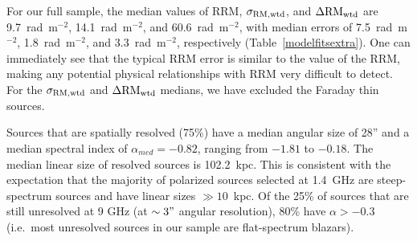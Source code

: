 \documentclass{mnras}
\newcommand*\sigmaRMwtd{\sigma_{\rm RM, wtd}}
\newcommand*\gradRMwtd{\Delta{\rm RM_{wtd}}}
\begin{document}
For our full sample, the median values of RRM, $\sigmaRMwtd$, and $\gradRMwtd$ are 9.7~rad~m$^{-2}$, 14.1~rad~m$^{-2}$, and 60.6~rad~m$^{-2}$, with median errors of 7.5~rad~m$^{-2}$, 1.8~rad~m$^{-2}$, and 3.3~rad~m$^{-2}$, respectively  (Table~\ref{modelfitsextra}). One can immediately see that the typical RRM error is similar to the value of the RRM, making any potential physical relationships with RRM very difficult to detect. For the $\sigmaRMwtd$ and $\gradRMwtd$ medians, we have excluded the Faraday thin sources.

Sources that are spatially resolved (75\%) have a median angular size of 28'' and a median spectral index of $\alpha_{med} = -0.82$, ranging from $-1.81$ to $-0.18$. The median linear size of resolved sources is 102.2~kpc. This is consistent with the expectation that the majority of polarized sources selected at 1.4~GHz are steep-spectrum sources and have linear sizes $\gg10$~kpc. Of the 25\% of sources that are still unresolved at 9 GHz (at $\sim3"$ angular resolution), 80\% have $\alpha>-0.3$ (i.e.~most unresolved sources in our sample are flat-spectrum blazars). 
\end{document}
